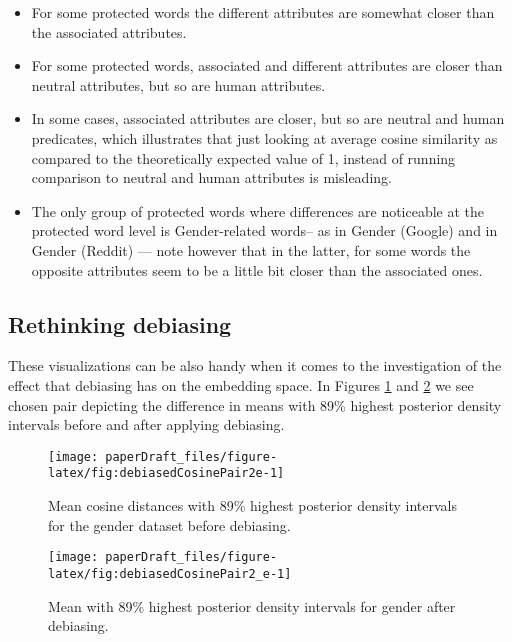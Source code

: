 \documentclass[
  12pt,
  dvipsnames,enabledeprecatedfontcommands]{scrartcl}
\begin{document}
\begin{itemize}
\item
  For some protected words the different attributes are somewhat closer
  than the associated attributes.
\item
  For some protected words, associated and different attributes are
  closer than neutral attributes, but so are human attributes.
\item
  In some cases, associated attributes are closer, but so are neutral
  and human predicates, which illustrates that just looking at average
  cosine similarity as compared to the theoretically expected value of
  1, instead of running comparison to neutral and human attributes is
  misleading.
\item
  The only group of protected words where differences are noticeable at
  the protected word level is Gender-related words-- as in Gender
  (Google) and in Gender (Reddit) --- note however that in the latter,
  for some words the opposite attributes seem to be a little bit closer
  than the associated ones.
\end{itemize}

\hypertarget{rethinking-debiasing}{%
\subsection{Rethinking debiasing}\label{rethinking-debiasing}}

\label{subsec:rethinking}

These visualizations can be also handy when it comes to the
investigation of the effect that debiasing has on the embedding space.
In Figures \ref{fig:empiricalPriorToDebiasing} and
\ref{fig:empiricalDebiased} we see chosen pair depicting the difference
in means with 89\% highest posterior density intervals before and after
applying debiasing.

\begin{figure}[H]

\begin{center}\texttt{[image: paperDraft\_files/figure-latex/fig:debiasedCosinePair2e-1]} \end{center}
\caption{Mean cosine distances with 89\% highest posterior density intervals for the  gender dataset before debiasing.}
\label{fig:empiricalPriorToDebiasing}
\end{figure}

\begin{figure}[H]

\begin{center}\texttt{[image: paperDraft\_files/figure-latex/fig:debiasedCosinePair2\_e-1]} \end{center}
\caption{Mean with 89\% highest posterior density intervals for gender after debiasing.}
\label{fig:empiricalDebiased}
\end{figure}
\end{document}
